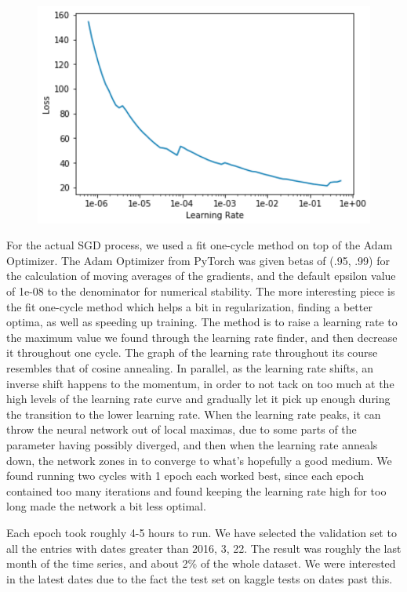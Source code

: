 \documentclass[10pt,twocolumn,letterpaper]{article}
\begin{document}
  \begin{figure}[]
    \centering
    \includegraphics[width=0.8\linewidth]{img/learningRate.png}
    \label{learningRate}
  \end{figure}

  For the actual SGD process, we used a fit one-cycle method on top of the Adam
  Optimizer. The Adam Optimizer from PyTorch was given betas of (.95, .99) for
  the calculation of moving averages of the gradients, and the default epsilon
  value of 1e-08 to the denominator for numerical stability. The more
  interesting piece is the fit one-cycle method which helps a bit in
  regularization, finding a better optima, as well as speeding up training. The
  method is to raise a learning rate to the maximum value we found through the
  learning rate finder, and then decrease it throughout one cycle. The graph of
  the learning rate throughout its course resembles that of cosine annealing. In
  parallel, as the learning rate shifts, an inverse shift happens to the
  momentum, in order to not tack on too much at the high levels of the learning
  rate curve and gradually let it pick up enough during the transition to the
  lower learning rate. When the learning rate peaks, it can throw the neural
  network out of local maximas, due to some parts of the parameter having
  possibly diverged, and then when the learning rate anneals down, the network
  zones in to converge to what’s hopefully a good medium. We found running two
  cycles with 1 epoch each worked best, since each epoch contained too many
  iterations and found keeping the learning rate high for too long made the
  network a bit less optimal.

  Each epoch took roughly 4-5 hours to run. We have selected the validation set
  to all the entries with dates greater than 2016, 3, 22. The result was roughly
  the last month of the time series, and about 2\% of the whole dataset. We were
  interested in the latest dates due to the fact the test set on kaggle tests on
  dates past this.
\end{document}

